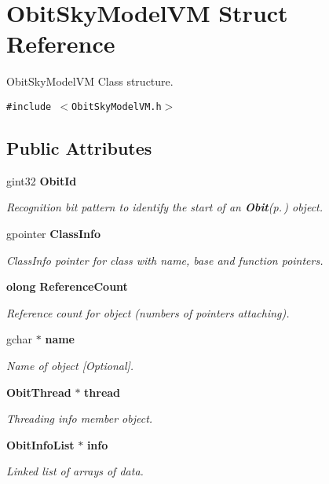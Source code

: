 \section{Obit\-Sky\-Model\-VM Struct Reference}
\label{structObitSkyModelVM}
Obit\-Sky\-Model\-VM Class structure.  


{\tt \#include $<$Obit\-Sky\-Model\-VM.h$>$}

\subsection*{Public Attributes}
\begin{CompactItemize}
\item 
gint32 {\bf Obit\-Id}
\begin{CompactList}\small\item\em Recognition bit pattern to identify the start of an {\bf Obit}{\rm (p.\,\pageref{structObit})} object. \item\end{CompactList}\item 
gpointer {\bf Class\-Info}
\begin{CompactList}\small\item\em Class\-Info pointer for class with name, base and function pointers. \item\end{CompactList}\item 
{\bf olong} {\bf Reference\-Count}
\begin{CompactList}\small\item\em Reference count for object (numbers of pointers attaching). \item\end{CompactList}\item 
gchar $\ast$ {\bf name}
\begin{CompactList}\small\item\em Name of object [Optional]. \item\end{CompactList}\item 
{\bf Obit\-Thread} $\ast$ {\bf thread}
\begin{CompactList}\small\item\em Threading info member object. \item\end{CompactList}\item 
{\bf Obit\-Info\-List} $\ast$ {\bf info}
\begin{CompactList}\small\item\em Linked list of arrays of data. \item\end{CompactList}\item 

\end{CompactItemize}
